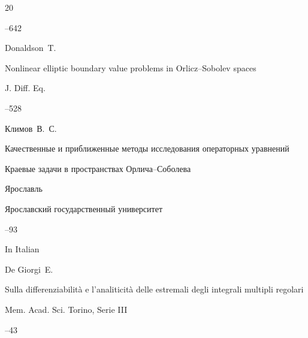 \begin{thebibliography}{20}

--642







\by  Donaldson~T.

\paper Nonlinear elliptic boundary value problems in Orlicz--Sobolev spaces

\jour J. Diff. Eq.




--528





\by Климов~В.~С.

\inbook  Качественные и приближенные методы исследования операторных уравнений


\paper Краевые задачи в пространствах Орлича--Соболева


\publaddr Ярославль

\publ Ярославский государственный университет


--93








\lang In Italian

\by  De Giorgi~E.

\paper Sulla differenziabilit\`a e l'analiticit\`a delle estremali degli integrali multipli regolari

\jour Mem. Acad. Sci. Torino, Serie III



--43



\end{thebibliography}
